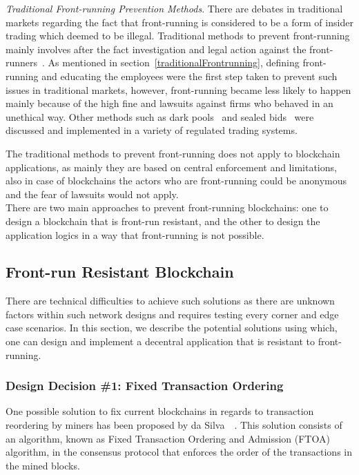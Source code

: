 \emph{Traditional Front-running Prevention Methods}. There are debates in traditional markets regarding the fact that front-running is considered to be a form of insider trading which deemed to be illegal. Traditional methods to prevent front-running mainly involves after the fact investigation and legal action against the front-runners~\cite{LexisNexisLawSuit}. As mentioned in section~\ref{traditionalFrontrunning}, defining front-running and educating the employees were the first step taken to prevent such issues in traditional markets, however, front-running became less likely to happen mainly because of the high fine and lawsuits against firms who behaved in an unethical way. Other methods such as dark pools~\cite{zhu2014dark, buti2011diving} and sealed bids~\cite{radner1989sealed} were discussed and implemented in a variety of regulated trading systems. 

The traditional methods to prevent front-running does not apply to blockchain applications, as mainly they are based on central enforcement and limitations, also in case of blockchains the actors who are front-running could be anonymous and the fear of lawsuits would not apply. \\

There are two main approaches to prevent front-running blockchains: one to design a blockchain that is front-run resistant, and the other to design the application logics in a way that front-running is not possible. 
\subsection{Front-run Resistant Blockchain}
There are technical difficulties to achieve such solutions as there are unknown factors within such network designs and requires testing every corner and edge case scenarios. In this section, we describe the potential solutions using which, one can design and implement a decentral application that is resistant to front-running.

\subsubsection{Design Decision \#1: Fixed Transaction Ordering\newline}
One possible solution to fix current blockchains in regards to transaction reordering by miners has been proposed by da Silva~\etal~\cite{fixedordering2018silva}. This solution consists of an algorithm, known as Fixed Transaction Ordering and Admission (FTOA) algorithm, in the consensus protocol that enforces the order of the transactions in the mined blocks.

